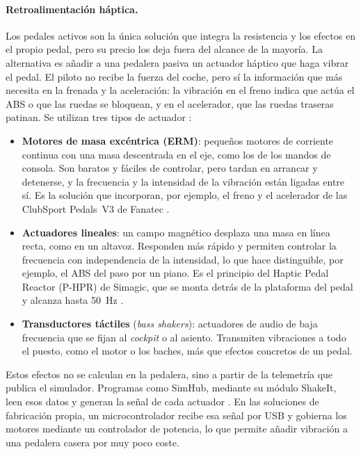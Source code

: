 \paragraph{Retroalimentación háptica.}
Los pedales activos son la única solución que integra la resistencia y los efectos en el propio pedal, pero su precio los deja fuera del alcance de la mayoría. La alternativa es añadir a una pedalera pasiva
un actuador háptico que haga vibrar el pedal. El piloto no recibe la fuerza del coche, pero sí la información que más necesita en la frenada y la aceleración: la vibración en el freno indica que actúa
el ABS o que las ruedas se bloquean, y en el acelerador, que las ruedas traseras patinan. Se utilizan tres tipos de actuador \parencite{choi_2013_vibrotactile}:
\begin{itemize}
	\item \textbf{Motores de masa excéntrica (ERM)}: pequeños motores de corriente continua con una masa
	descentrada en el eje, como los de los mandos de consola. Son baratos y fáciles de controlar, pero tardan en arrancar y detenerse, y la frecuencia y la intensidad de la vibración están ligadas entre sí. Es la solución que incorporan, por ejemplo, el freno y el acelerador de las ClubSport Pedals~V3 de Fanatec \parencite{fanatec_web}.
	\item \textbf{Actuadores lineales}: un campo magnético desplaza una masa en línea recta, como en un altavoz. Responden más rápido y permiten controlar la frecuencia con independencia de la intensidad,
	lo que hace distinguible, por ejemplo, el ABS del paso por un piano. Es el principio del Haptic Pedal Reactor (P-HPR) de Simagic, que se monta detrás de la plataforma del pedal y alcanza hasta
	50~Hz \parencite{simagic_web}.
	\item \textbf{Transductores táctiles} (\textit{bass shakers}): actuadores de audio de baja frecuencia que se fijan al \textit{cockpit} o al asiento. Transmiten vibraciones a todo el puesto, como el motor o los baches, más que efectos concretos de un pedal.
\end{itemize}
Estos efectos no se calculan en la pedalera, sino a partir de la telemetría que publica el simulador. Programas como SimHub, mediante su módulo ShakeIt, leen esos datos y generan la señal de cada
actuador \parencite{simhub_web}. En las soluciones de fabricación propia, un microcontrolador recibe esa señal por USB y gobierna los motores mediante un controlador de potencia, lo que permite añadir vibración a una pedalera casera por muy poco coste.

